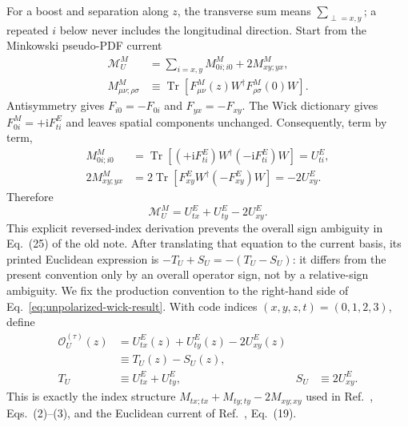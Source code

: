 \documentclass[11pt]{article}
\numberwithin{equation}{section}
\newcommand{\ii}{\mathrm{i}}
\newcommand{\cO}{\mathcal{O}}
\DeclareMathOperator{\Tr}{Tr}
\begin{document}
For a boost and separation along \(z\), the transverse sum means
\(\sum_{\perp=x,y}\); a repeated \(i\) below never includes the longitudinal
direction.  Start from the Minkowski pseudo-PDF current
\cite{KhanEtAl2021UnpolarizedGluon}
\begin{align}
 \mathcal M_U^M
 &=\sum_{i=x,y}M^M_{0i;i0}+2M^M_{xy;yx},
 \label{eq:unpolarized-minkowski-start}\\
 M^M_{\mu\nu;\rho\sigma}
 &\equiv
 \Tr\!\left[F^M_{\mu\nu}(z)W^\dagger
               F^M_{\rho\sigma}(0)W\right].
\end{align}
Antisymmetry gives \(F_{i0}=-F_{0i}\) and \(F_{yx}=-F_{xy}\).
The Wick dictionary gives
\(F^M_{0i}=+\ii F^E_{ti}\) and leaves spatial components unchanged.
Consequently, term by term,
\begin{align}
 M^M_{0i;i0}
 &=\Tr\!\left[(+\ii F^E_{ti})W^\dagger
                 (-\ii F^E_{ti})W\right]
   =U^E_{ti},\\
 2M^M_{xy;yx}
 &=2\Tr\!\left[F^E_{xy}W^\dagger(-F^E_{xy})W\right]
   =-2U^E_{xy}.
 \label{eq:unpolarized-termwise-wick}
\end{align}
Therefore
\begin{equation}
 \mathcal M_U^M
 =U^E_{tx}+U^E_{ty}-2U^E_{xy}.
 \label{eq:unpolarized-wick-result}
\end{equation}
This explicit reversed-index derivation prevents the overall sign ambiguity
in Eq.~(25) of the old note.  After translating that equation to the current
basis, its printed Euclidean expression is
\(-T_U+S_U=-(T_U-S_U)\): it differs from the present convention only by an
overall operator sign, not by a relative-sign ambiguity.  We fix the
production convention to the right-hand side of
Eq.~\eqref{eq:unpolarized-wick-result}.  With code indices
\((x,y,z,t)=(0,1,2,3)\), define
\begin{align}
  \cO_U^{(\tau)}(z)
  &=U^E_{tx}(z)+U^E_{ty}(z)-2U^E_{xy}(z)\nonumber\\
  &\equiv T_U(z)-S_U(z),
  \label{eq:flowed-unpolarized-operator}\\
  T_U&\equiv U^E_{tx}+U^E_{ty},
  &S_U&\equiv2U^E_{xy}.
\end{align}
This is exactly the index structure
\(M_{tx;tx}+M_{ty;ty}-2M_{xy;xy}\) used in
Ref.~\cite{ChenEtAl2025GluonPDF}, Eqs.~(2)--(3), and the Euclidean current
of Ref.~\cite{KhanEtAl2021UnpolarizedGluon}, Eq.~(19).
\end{document}
